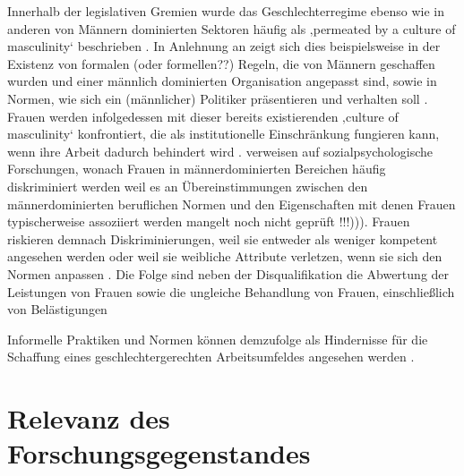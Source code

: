 \documentclass[12pt, 
    twoside=false, 
    bibliography=totoc, 
    numbers=endperiod, 
    headings=normal, 
    toc=chapterentrydotfill
    ]{scrbook}
\begin{document}
Innerhalb der legislativen Gremien wurde das Geschlechterregime ebenso wie in anderen von Männern dominierten Sektoren häufig als ‚permeated by a culture of masculinity‘ beschrieben \parencites[200]{erikson_2018}{lovenduski_2005}. In Anlehnung an \textcite{acker_1990} zeigt sich dies beispielsweise in der Existenz von formalen (oder formellen??) Regeln, die von Männern geschaffen wurden und einer männlich dominierten Organisation angepasst sind, sowie in Normen, wie sich ein (männlicher) Politiker präsentieren und verhalten soll \parencites[200]{erikson_2018}[48]{acker_1990}. Frauen werden infolgedessen mit dieser bereits existierenden ‚culture of masculinity‘ konfrontiert, die als institutionelle Einschränkung fungieren kann, wenn ihre Arbeit dadurch behindert wird \parencites[200]{erikson_2018}[47-56]{lovenduski_2005}. \textcite{erikson_2018} verweisen auf sozialpsychologische Forschungen, wonach Frauen in männerdominierten Bereichen häufig diskriminiert werden weil es an Übereinstimmungen zwischen den männerdominierten beruflichen Normen und den Eigenschaften mit denen Frauen typischerweise assoziiert werden mangelt \parencites[vgl.][]{burgess_1999}{eagly_2002}{heilman_2001}{heilman_2004} noch nicht geprüft !!!))). Frauen riskieren demnach Diskriminierungen, weil sie entweder als weniger kompetent angesehen werden oder weil sie weibliche Attribute verletzen, wenn sie sich den Normen anpassen \parencite[200]{erikson_2018}. Die Folge sind neben der Disqualifikation die Abwertung der Leistungen von Frauen sowie die ungleiche Behandlung von Frauen, einschließlich von Belästigungen \parencites[200]{erikson_2018}{heilman_2001}{burgess_1999}

\begin{quote}
     \parencite[200]{erikson_2018}
\end{quote}

Informelle Praktiken und Normen können demzufolge als Hindernisse für die Schaffung eines geschlechtergerechten Arbeitsumfeldes angesehen werden \parencite[200]{erikson_2018}. 



\chapter{Relevanz des Forschungsgegenstandes}
\end{document}
